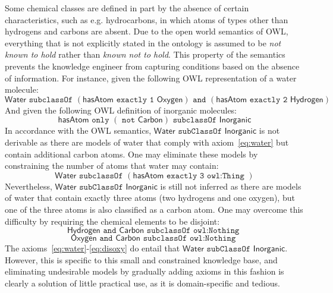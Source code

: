 \documentclass[10pt]{bmc_article}
\newenvironment{bmcformat}{\baselineskip20pt\sloppy\setboolean{publ}{false}}{\baselineskip20pt\sloppy}
\begin{document}
\begin{bmcformat}
Some chemical classes are defined in part by the absence of certain characteristics, such as e.g. hydrocarbons, in which atoms of types other than hydrogens and carbons are absent. Due to the open world semantics of OWL, everything that is not explicitly stated in the ontology is assumed to be \emph{not known to hold} rather than \emph{known not to hold}. This property of the semantics prevents the knowledge engineer from capturing conditions based on the absence of information. For instance, given the following OWL representation of a water molecule:
%
\begin{equation}
\label{eq:water}
\mathsf{Water \texttt{ subclassOf } (hasAtom \texttt{ exactly 1 } Oxygen) \texttt{ and } (hasAtom \texttt{ exactly 2 } Hydrogen)}
\end{equation}
%
And given the following OWL definition of inorganic molecules:
\begin{equation}
\label{eq:inorganic}
\mathsf{hasAtom \texttt{ only }(\texttt{ not } Carbon) \texttt{ subclassOf } Inorganic}
\end{equation}
In accordance with the OWL semantics, $\mathsf{Water} \texttt{ subClassOf } \mathsf{Inorganic}$ is not derivable as there are models of water that comply with axiom~\eqref{eq:water} but contain additional carbon atoms. One may eliminate these models by constraining the number of atoms that water may contain:
\begin{equation}
\label{eq:three}
\mathsf{Water \texttt{ subclassOf } (hasAtom \texttt{ exactly 3 owl:Thing } ) }
\end{equation}
%
Nevertheless, $\mathsf{Water} \texttt{ subClassOf } \mathsf{Inorganic}$  is still not inferred as there are models of water that contain exactly three atoms (two hydrogens and one oxygen), but one of the three atoms is also classified as a carbon atom. One may overcome this difficulty by requiring the chemical elements to be disjoint:
\begin{equation}
\label{eq:dishyd}
\mathsf{Hydrogen \texttt{ and } Carbon \texttt{ subclassOf owl:Nothing } }
\end{equation}
\begin{equation}
\label{eq:disoxy}
\mathsf{Oxygen \texttt{ and } Carbon \texttt{ subclassOf owl:Nothing } }
\end{equation}
The axioms~\eqref{eq:water}-\eqref{eq:disoxy} do entail that $\mathsf{Water} \texttt{ subClassOf } \mathsf{Inorganic}$. However, this is specific to this small and constrained knowledge base, and eliminating undesirable models by gradually adding axioms in this fashion is clearly a solution of little practical use, as it is domain-specific and tedious.


\end{bmcformat}
\end{document}

